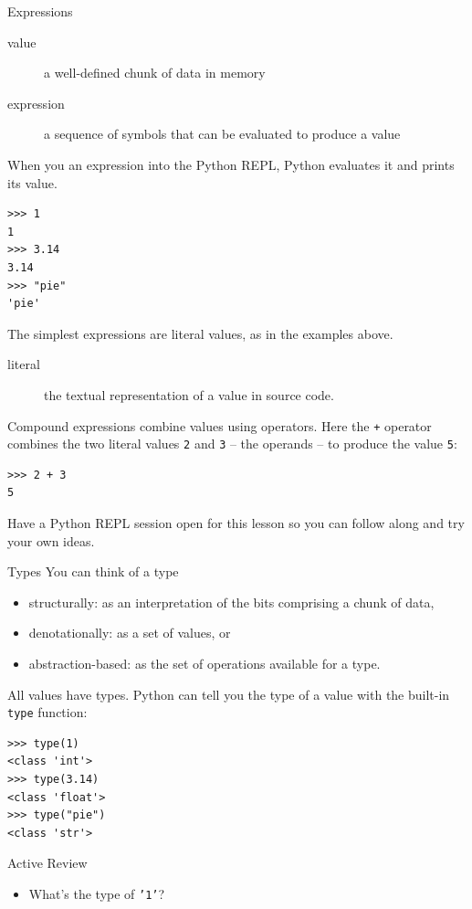 \documentclass[smaller, aspectratio=1610]{beamer}
\begin{document}
\begin{frame}[label={sec:org67faa56},fragile]{Expressions}
 \begin{description}
\item[{value}] a well-defined chunk of data in memory
\item[{expression}] a sequence of symbols that can be \alert{evaluated} to produce a value
\end{description}

When you an expression into the Python REPL, Python evaluates it and prints its value.

\lstset{language=Python,label= ,caption= ,captionpos=b,numbers=none}
\begin{lstlisting}
>>> 1
1
>>> 3.14
3.14
>>> "pie"
'pie'
\end{lstlisting}

The simplest expressions are \alert{literal} values, as in the examples above.

\begin{description}
\item[{literal}] the textual representation of a value in source code.
\end{description}

Compound expressions combine values using operators.  Here the \texttt{+} operator combines the two literal values \texttt{2} and \texttt{3} -- the \alert{operands} -- to produce the value \texttt{5}:

\lstset{language=Python,label= ,caption= ,captionpos=b,numbers=none}
\begin{lstlisting}
>>> 2 + 3
5
\end{lstlisting}

Have a Python REPL session open for this lesson so you can follow along and try your own ideas.
\end{frame}

\begin{frame}[label={sec:org7fc6757},fragile]{Types}
 You can think of a type
\begin{itemize}
\item structurally: as an interpretation of the bits comprising a chunk of data,
\item denotationally: as a set of values, or
\item abstraction-based: as the set of operations available for a type.
\end{itemize}

All values have types. Python can tell you the type of a value with the built-in \texttt{type} function:

\lstset{language=Python,label= ,caption= ,captionpos=b,numbers=none}
\begin{lstlisting}
>>> type(1)
<class 'int'>
>>> type(3.14)
<class 'float'>
>>> type("pie")
<class 'str'>
\end{lstlisting}

\begin{block}{Active Review}
\begin{itemize}
\item What's the type of \texttt{'1'}?
\end{itemize}
\end{block}
\end{frame}
\end{document}
